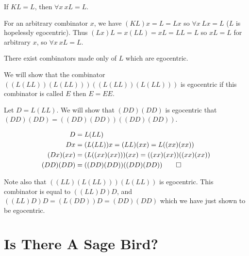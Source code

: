 \begin{thm}

If $KL = L$, then $\forall x\ xL = L$.

\bp

For an arbitrary combinator $x$, we have $(KL)x = L = Lx$ so $\forall x\ Lx = L$
($L$ is hopelessly egocentric).  Thus $(Lx)L = x(LL) = xL = LL = L$ so $xL = L$
for arbitrary $x$, so $\forall x\ xL = L$. \qedhere

\ep

\end{thm}

\begin{thm}

There exist combinators made only of $L$ which are egocentric.


\bp

We will show that the combinator $((L(LL))(L(LL)))((L(LL))(L(LL)))$ is
egocentric \ie if this combinator is called $E$ then $E = EE$.

\vsep

\ni Let $D = L(LL)$.  We will show that $(DD)(DD)$ is egocentric \ie that
$(DD)(DD) = ((DD)(DD))((DD)(DD))$.

\begin{align*}
D &= L(LL)  \\
Dx &= (L(LL))x = (LL)(xx) = L((xx)(xx))  \\
(Dx)(xx) &= (L((xx)(xx)))(xx) = ((xx)(xx))((xx)(xx))  \\
(DD)(DD) &= ((DD)(DD))((DD)(DD))  \qedhere
\end{align*}

\ni Note also that $((LL)(L(LL)))(L(LL))$ is egocentric.  This combinator is
equal to $((LL)D)D$, and $((LL)D)D = (L(DD))D = (DD)(DD)$ which we have just
shown to be egocentric.

\ep

\end{thm}

\chapter{Is There A Sage Bird?}

